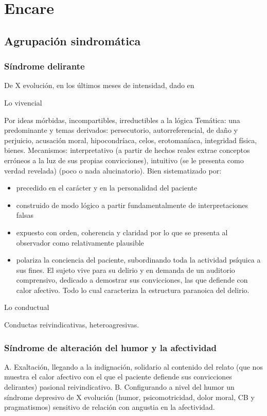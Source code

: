 \section*{Encare}
\subsection*{Agrupación sindromática}
\subsubsection*{Síndrome delirante}
De X evolución, en los últimos meses de intensidad, dado en

Lo vivencial

Por ideas mórbidas, incompartibles, irreductibles a la lógica Temática: una predominante y temas derivados: persecutorio, autorreferencial, de daño y perjuicio, acusación moral, hipocondríaca, celos, erotomaníaca, integridad física, bienes. Mecanismos: interpretativo (a partir de hechos reales extrae conceptos erróneos a la luz de sus propias convicciones), intuitivo (se le presenta como verdad revelada) (poco o nada alucinatorio). Bien sistematizado por:
\begin{itemize}
	\item precedido en el carácter y en la personalidad del paciente
	\item construido de modo lógico a partir fundamentalmente de interpretaciones falsas
	\item expuesto con orden, coherencia y claridad por lo que se presenta al observador como relativamente plausible
	\item polariza la conciencia del paciente, subordinando toda la actividad psíquica a sus fines. El sujeto vive para su delirio y en demanda de un auditorio comprensivo, dedicado a demostrar sus convicciones, las que defiende con calor afectivo. Todo lo cual caracteriza la estructura paranoica del delirio.
\end{itemize}
Lo conductual

Conductas reivindicativas, heteroagresivas.

\subsubsection*{Síndrome de alteración del humor y la afectividad}
A. Exaltación, llegando a la indignación, solidario al contenido del relato (que nos muestra el calor afectivo con el que el paciente defiende sus convicciones delirantes) pasional reivindicativo.
B. Configurando a nivel del humor un síndrome depresivo de X evolución (humor, psicomotricidad, dolor moral, CB y pragmatismos) sensitivo de relación con angustia en la afectividad. 

